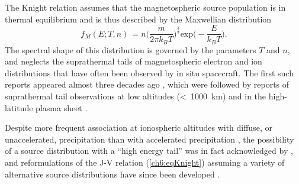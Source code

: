   The Knight relation assumes that the magnetospheric source population is in
  thermal equilibrium and is thus described by the Maxwellian distribution
  \begin{equation} \label{ch6:eqMax1D} f_{M}( E ; T, n) \, = n \Big (
    \dfrac{m}{2 \pi k_{B} T} \Big )^{\frac{3}{2}} \textrm{exp} \Big (
    - \dfrac{E}{ k_B T } \Big ).
  \end{equation}
  The spectral shape of this distribution is governed by the parameters $T$ and
  $n$, and neglects the suprathermal tails of magnetospheric electron and ion
  distributions that have often been observed by in situ spacecraft. The first
  such reports appeared almost three decades ago
  \citep{Christon1989,Christon1991}, which were followed by reports of
  suprathermal tail observations at low altitudes (<~1000~km) and in the
  high-latitude plasma sheet \citep{Wing1998,Kletzing2003}.

  Despite more frequent association at ionospheric altitudes with diffuse, or
  unaccelerated, precipitation than with accelerated precipitation \citep[see,
  e.g., ][]{Newell2009,McIntosh2014}, the possibility of a source distribution
  with a ``high energy tail'' was in fact acknowledged by \citet{Knight1973},
  and reformulations of the J-V relation (\ref{ch6:eqKnight}) assuming a variety
  of alternative source distributions have since been developed
  \citep{Pierrard1996,Janhunen1998,Dors1999,Bostrom2003a,Bostrom2004}.


